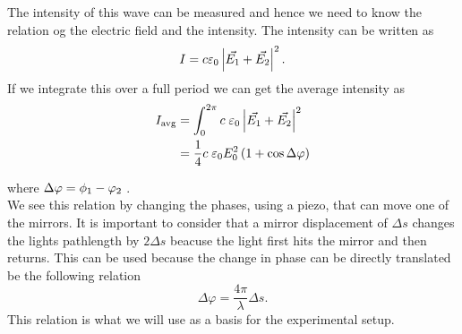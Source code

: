 The intensity of this wave can be measured and hence we need to know the relation og the electric field and the intensity. The intensity can be written as
$$I = c \varepsilon_{\textup{0}} \left|\vec{E_{\textup{1}}} + \vec{E_{\textup{2}}}\right|^{2}.$$
If we integrate this over a full period we can get the average intensity as
\begin{align*}
    I_{\textup{avg}} &= \int_{0}^{2\pi} c\;\varepsilon_{\textup{0}} \left|\vec{E_{\textup{1}}} + \vec{E_{\textup{2}}}\right|^{2}\\
    &= \frac{1}{4} c\;\varepsilon_{\textup{0}}E_{\textup{0}}^{2}\left(1+\cos{\Delta\varphi}\right)
\end{align*}

where $\Delta\varphi = \phi_{\textup{1}}-\varphi_{\textup{2}}$
\autocite{Eldyn}. \\
We see this relation by changing the phases, using a piezo, that can move one of the mirrors. 
It is important to consider that a mirror displacement of $\Delta s$ changes the lights pathlength by $2 \Delta s$ beacuse the light first hits the mirror and then returns. 
This can be used because the change in phase can be directly translated be the following relation
$$\Delta\varphi = \frac{4\pi}{\lambda}\Delta s.$$
This relation is what we will use as a basis for the experimental setup.
